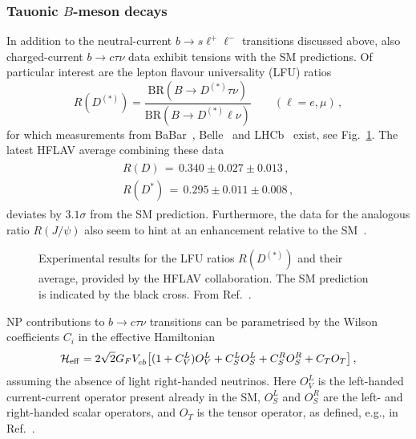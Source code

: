 \documentclass[10pt]{article}
\begin{document}
\subsubsection[Tauonic $B$-meson decays]{\boldmath Tauonic $B$-meson decays}
\label{sec:RD}
%
In addition to the neutral-current $b\to s\ell^+\ell^-$ transitions discussed above, also charged-current $b\to c\tau\nu$ data exhibit tensions with the SM predictions. Of particular interest are the lepton flavour universality (LFU) ratios
\begin{equation}
R(D^{(*)})=\frac{\text{BR}(B\to D^{(*)} \tau
  \nu)}{\text{BR}(B\to D^{(*)} \ell \nu)} \qquad (\ell=e,\mu)\,,
\end{equation}
for which measurements from BaBar~\cite{Lees:2012xj,Lees:2013uzd}, Belle~\cite{Huschle:2015rga,Hirose:2016wfn,Hirose:2017dxl,Abdesselam:2019dgh} and LHCb~\cite{Aaij:2015yra,Aaij:2017uff,Aaij:2017deq} exist, see Fig.~\ref{fig:rdrds}.
The latest HFLAV average combining these data~\cite{Amhis:2016xyh}
\begin{eqnarray}
\begin{aligned}
R(D)\,=\,{0.340\pm0.027 \pm  0.013}\,, \label{new_average}\\
R(D^*)\,=\,{0.295\pm0.011  \pm 0.008 }\,,
\end{aligned}
\end{eqnarray}
deviates by $3.1\sigma$ from the SM prediction. Furthermore, the data for the analogous ratio $R(J/\psi)$ also seem to hint at an enhancement relative to the SM~\cite{Aaij:2017tyk}.

\begin{figure}
\caption{Experimental results for the LFU ratios $R(D^{(*)})$ and their average, provided by the HFLAV collaboration. The SM prediction is indicated by the black cross. From Ref.~\cite{Amhis:2016xyh}.}
\label{fig:rdrds}
\end{figure}

NP contributions to $b\to c\tau\nu$ transitions can be parametrised by the Wilson coefficients $C_i$ in the effective Hamiltonian
\begin{equation}
 {\cal H}_{\rm eff}=  2\sqrt{2} G_{F} V^{}_{cb} \big[(1+C_{V}^{L}) O_{V}^L + C_{S}^{L} O_{S}^L+  C_{S}^{R} O_{S}^{R} 
   +   C_{T} O_{T}\big] \,,
\label{eq:Heff}
\end{equation}
assuming the absence of light right-handed neutrinos. Here $O_{V}^L$ is the left-handed current-current operator present already in the SM, $O_{S}^L$ and $O_{S}^R$ are the left- and right-handed scalar operators, and $O_T$ is the tensor operator, as defined, e.g., in Ref.~\cite{Blanke:2018yud}. 
\end{document}
